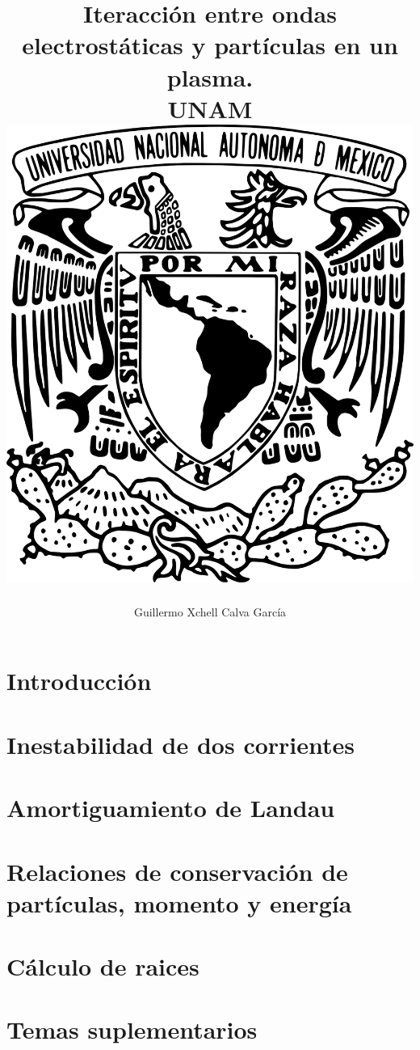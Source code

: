 \documentclass[12pt,letterpaper]{report}
\title{
	{Iteracción entre ondas electrostáticas y partículas en un plasma.}\\
	{\large UNAM}\\
	{\includegraphics{Escudo-UNAM-transparente.png}}
}
\author{Guillermo Xchell Calva García}
\date{}
\newcommand{\onlyinsubfile}[1]{#1}
\newcommand{\notinsubfile}[1]{}
\begin{document}
\renewcommand{\onlyinsubfile}[1]{}
\renewcommand{\notinsubfile}[1]{#1}
\maketitle
%
%
%

\tableofcontents
\listoffigures
{}
\selectfont
\chapter{Introducción}

\label{Ch1:Intro}
\chapter{Inestabilidad de dos corrientes}
\label{Ch2:inestabilidades}
\chapter{Amortiguamiento de Landau}\label{Ch3:Landau}

\chapter{ Relaciones de conservación de partículas, momento y energía}\label{Ch4:cuasilineal}

\appendix
\chapter{Cálculo de raices}
\label{Ap:raices}
\chapter{Temas suplementarios}
\label{Ap:transformadas}

\cleardoublepage{}
{}


\end{document}
